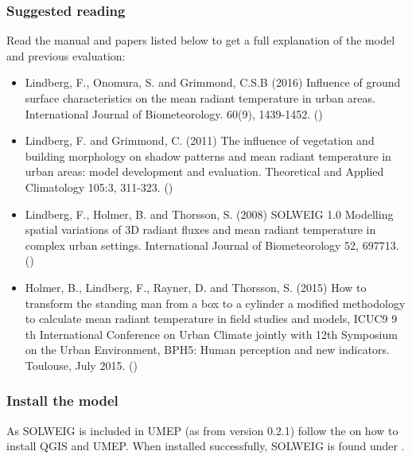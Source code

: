 \documentclass[letterpaper,10pt,english]{sphinxmanual}
\begin{document}
\subsubsection{Suggested reading}
\label{\detokenize{OtherManuals/SOLWEIG:suggested-reading}}
Read the manual and papers listed below to get a full explanation of the
model and previous evaluation:
\begin{itemize}
\item {} 
Lindberg, F., Onomura, S. and Grimmond, C.S.B (2016) Influence of
ground surface characteristics on the mean radiant temperature in
urban areas. International Journal of Biometeorology. 60(9),
1439-1452. ()

\item {} 
Lindberg, F. and Grimmond, C. (2011) The influence of vegetation and
building morphology on shadow patterns and mean radiant temperature
in urban areas: model development and evaluation. Theoretical and
Applied Climatology 105:3, 311-323. ()

\item {} 
Lindberg, F., Holmer, B. and Thorsson, S. (2008) SOLWEIG 1.0 \textendash{}
Modelling spatial variations of 3D radiant fluxes and mean radiant
temperature in complex urban settings. International Journal of
Biometeorology 52, 697\textendash{}713. ()

\item {} 
Holmer, B., Lindberg, F., Rayner, D. and Thorsson, S. (2015) How to
transform the standing man from a box to a cylinder \textendash{} a modified
methodology to calculate mean radiant temperature in field studies
and models, ICUC9 \textendash{} 9 th International Conference on Urban Climate
jointly with 12th Symposium on the Urban Environment, BPH5: Human
perception and new indicators. Toulouse, July 2015. ()

\end{itemize}


\subsubsection{Install the model}
\label{\detokenize{OtherManuals/SOLWEIG:install-the-model}}
As SOLWEIG is included in UMEP (as from version 0.2.1) follow the
{\hyperref[\detokenize{Getting_Started:getting-started}]{}}
on how to install QGIS and UMEP. When installed successfully, SOLWEIG is
found under .
\end{document}
